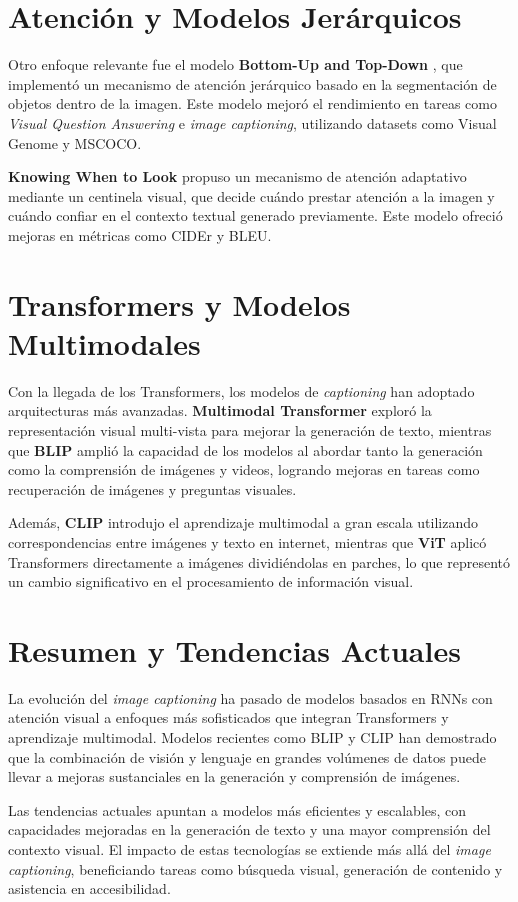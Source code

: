 \section{Atención y Modelos Jerárquicos}

Otro enfoque relevante fue el modelo \textbf{Bottom-Up and Top-Down} \cite{anderson2018bottom}, que implementó un mecanismo de atención jerárquico basado en la segmentación de objetos dentro de la imagen. Este modelo mejoró el rendimiento en tareas como \textit{Visual Question Answering} e \textit{image captioning}, utilizando datasets como Visual Genome y MSCOCO.

\textbf{Knowing When to Look} \cite{lu2017knowing} propuso un mecanismo de atención adaptativo mediante un centinela visual, que decide cuándo prestar atención a la imagen y cuándo confiar en el contexto textual generado previamente. Este modelo ofreció mejoras en métricas como CIDEr y BLEU.

\section{Transformers y Modelos Multimodales}

Con la llegada de los Transformers, los modelos de \textit{captioning} han adoptado arquitecturas más avanzadas. \textbf{Multimodal Transformer} \cite{yu2019multimodal} exploró la representación visual multi-vista para mejorar la generación de texto, mientras que \textbf{BLIP} \cite{li2022blip} amplió la capacidad de los modelos al abordar tanto la generación como la comprensión de imágenes y videos, logrando mejoras en tareas como recuperación de imágenes y preguntas visuales.

Además, \textbf{CLIP} \cite{radford2021learning} introdujo el aprendizaje multimodal a gran escala utilizando correspondencias entre imágenes y texto en internet, mientras que \textbf{ViT} \cite{dosovitskiy2021image} aplicó Transformers directamente a imágenes dividiéndolas en parches, lo que representó un cambio significativo en el procesamiento de información visual.

\section{Resumen y Tendencias Actuales}

La evolución del \textit{image captioning} ha pasado de modelos basados en RNNs con atención visual a enfoques más sofisticados que integran Transformers y aprendizaje multimodal. Modelos recientes como BLIP y CLIP han demostrado que la combinación de visión y lenguaje en grandes volúmenes de datos puede llevar a mejoras sustanciales en la generación y comprensión de imágenes. 

Las tendencias actuales apuntan a modelos más eficientes y escalables, con capacidades mejoradas en la generación de texto y una mayor comprensión del contexto visual. El impacto de estas tecnologías se extiende más allá del \textit{image captioning}, beneficiando tareas como búsqueda visual, generación de contenido y asistencia en accesibilidad.

